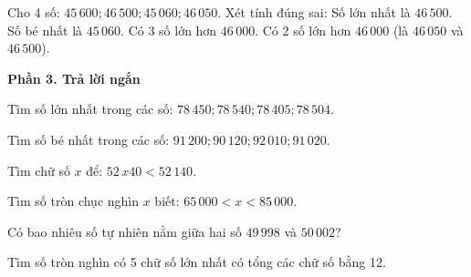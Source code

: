 \begin{ex} %
Cho 4 số: $45\,600; 46\,500; 45\,060; 46\,050$. Xét tính đúng sai:
\choiceTF
{\True Số lớn nhất là $46\,500$.}
{\True Số bé nhất là $45\,060$.}
{Có 3 số lớn hơn $46\,000$.}
{\True Có 2 số lớn hơn $46\,000$ (là $46\,050$ và $46\,500$).}
\end{ex}

\textbf{Phần 3. Trả lời ngắn}

\begin{ex} %
Tìm số lớn nhất trong các số: $78\,450; 78\,540; 78\,405; 78\,504$.
\end{ex}

\begin{ex} %
Tìm số bé nhất trong các số: $91\,200; 90\,120; 92\,010; 91\,020$.
\end{ex}

\begin{ex} %
Tìm chữ số $x$ để: $52\,x40 < 52\,140$.
\end{ex}

\begin{ex} %
Tìm số tròn chục nghìn $x$ biết: $65\,000 < x < 85\,000$.
\end{ex}

\begin{ex} %
Có bao nhiêu số tự nhiên nằm giữa hai số $49\,998$ và $50\,002$?
\end{ex}

\begin{ex} %
Tìm số tròn nghìn có 5 chữ số lớn nhất có tổng các chữ số bằng 12.
\end{ex}

